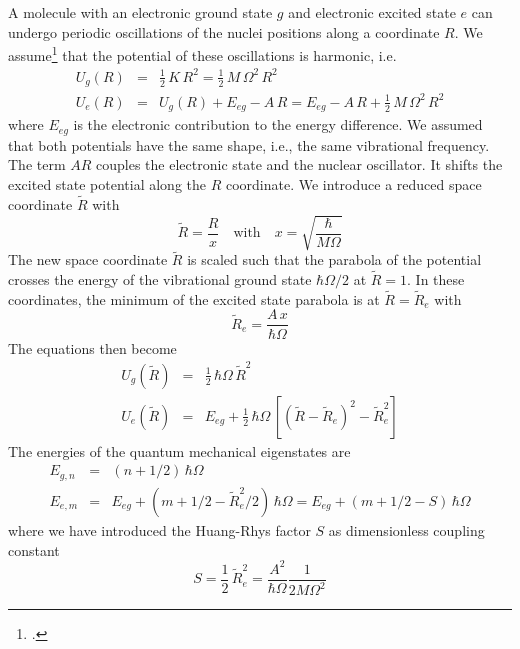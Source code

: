 A molecule with an electronic ground state $g$ and electronic excited state $e$ can undergo periodic oscillations of the nuclei positions along a coordinate $R$. We assume\footcite{Kuzmany} that the potential of these oscillations is harmonic, i.e.
\begin{eqnarray}
 U_g(R) &=& \frac{1}{2} \,  K \, R^2 = \frac{1}{2} \, M \, \Omega^2 \, R^2 \\
  U_e(R) &=&  U_g(R) + E_{eg} - A \, R = E_{eg}  - A \, R + \frac{1}{2} \, M \, \Omega^2 \, R^2 
 \end{eqnarray}
where $E_{eg}$ is the electronic contribution to the energy difference. We assumed that both potentials have the same shape, i.e., the same vibrational frequency. 
The term $A R $ couples the electronic state and the nuclear oscillator. It shifts the excited state potential along the $R$ coordinate. 
%
We introduce a reduced space coordinate $\tilde{R}$ with
\begin{equation}
\tilde{R} = \frac{R}{x} \quad \text{with} \quad x = \sqrt{\frac{\hbar}{M \Omega}} 
\end{equation}
The new  space coordinate $\tilde{R}$ is scaled such that the parabola of the potential crosses the energy of the  vibrational ground state $\hbar \Omega/2$ at $\tilde{R} = 1$.
In these coordinates, the minimum of the excited state parabola is at $\tilde{R} = \tilde{R}_e$ with
\begin{equation}
\tilde{R}_e = \frac{A \, x}{ \hbar \Omega}
\end{equation}
The equations then become
\begin{eqnarray}
 U_g(\tilde{R}) &=& \frac{1}{2}  \, \hbar \Omega \, \tilde{R}^2 \\
  U_e(\tilde{R}) &=&   E_{eg} + \frac{1}{2}  \, \hbar \Omega  \, \left[  (\tilde{R} - \tilde{R}_e)^2 - \tilde{R}_e^2  \right]
 \end{eqnarray}
The energies of the quantum mechanical eigenstates are 
\begin{eqnarray}
  E_{g, n} &=&  (n + 1/2) \, \hbar \Omega  \\
  E_{e, m} &=&   E_{eg} +   (m + 1/2 - \tilde{R}_e^2  /2 ) \, \hbar \Omega  =  E_{eg} +   (m + 1/2 - S ) \, \hbar \Omega   \nonumber
\end{eqnarray}
where we have  introduced the Huang-Rhys factor $S$ as dimensionless coupling constant
\begin{equation}
 S = \frac{1}{2} \, \tilde{R}_e^2  =
 \frac{A^2}{\hbar \Omega} \frac{1}{2 M \Omega^2}
\end{equation}

